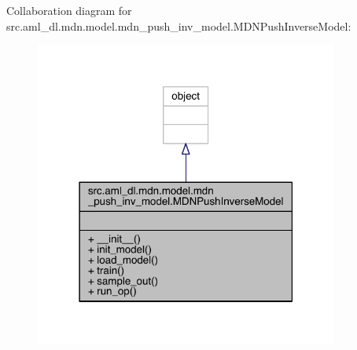 Collaboration diagram for src.\+aml\+\_\+dl.\+mdn.\+model.\+mdn\+\_\+push\+\_\+inv\+\_\+model.\+M\+D\+N\+Push\+Inverse\+Model\+:\nopagebreak
\begin{figure}[H]
\begin{center}
\leavevmode
\includegraphics[width=283pt]{classsrc_1_1aml__dl_1_1mdn_1_1model_1_1mdn__push__inv__model_1_1_m_d_n_push_inverse_model__coll__graph}
\end{center}
\end{figure}
